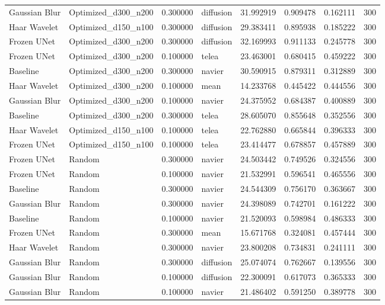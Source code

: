 \begin{table}[h]
\begin{tabular}{llrlrrrr}
Gaussian Blur & Optimized\_d300\_n200 & 0.300000 & diffusion & 31.992919 & 0.909478 & 0.162111 & 300 \\
Haar Wavelet & Optimized\_d150\_n100 & 0.300000 & diffusion & 29.383411 & 0.895938 & 0.185222 & 300 \\
Frozen UNet & Optimized\_d300\_n200 & 0.300000 & diffusion & 32.169993 & 0.911133 & 0.245778 & 300 \\
Frozen UNet & Optimized\_d300\_n200 & 0.100000 & telea & 23.463001 & 0.680415 & 0.459222 & 300 \\
Baseline & Optimized\_d300\_n200 & 0.300000 & navier & 30.590915 & 0.879311 & 0.312889 & 300 \\
Haar Wavelet & Optimized\_d300\_n200 & 0.100000 & mean & 14.233768 & 0.445422 & 0.444556 & 300 \\
Gaussian Blur & Optimized\_d300\_n200 & 0.100000 & navier & 24.375952 & 0.684387 & 0.400889 & 300 \\
Baseline & Optimized\_d300\_n200 & 0.300000 & telea & 28.605070 & 0.855648 & 0.352556 & 300 \\
Haar Wavelet & Optimized\_d150\_n100 & 0.100000 & telea & 22.762880 & 0.665844 & 0.396333 & 300 \\
Frozen UNet & Optimized\_d150\_n100 & 0.100000 & telea & 23.414477 & 0.678857 & 0.457889 & 300 \\
Frozen UNet & Random & 0.300000 & navier & 24.503442 & 0.749526 & 0.324556 & 300 \\
Frozen UNet & Random & 0.100000 & navier & 21.532991 & 0.596541 & 0.465556 & 300 \\
Baseline & Random & 0.300000 & navier & 24.544309 & 0.756170 & 0.363667 & 300 \\
Gaussian Blur & Random & 0.300000 & navier & 24.398089 & 0.742701 & 0.161222 & 300 \\
Baseline & Random & 0.100000 & navier & 21.520093 & 0.598984 & 0.486333 & 300 \\
Frozen UNet & Random & 0.300000 & mean & 15.671768 & 0.324081 & 0.457444 & 300 \\
Haar Wavelet & Random & 0.300000 & navier & 23.800208 & 0.734831 & 0.241111 & 300 \\
Gaussian Blur & Random & 0.300000 & diffusion & 25.074074 & 0.762667 & 0.139556 & 300 \\
Gaussian Blur & Random & 0.100000 & diffusion & 22.300091 & 0.617073 & 0.365333 & 300 \\
Gaussian Blur & Random & 0.100000 & navier & 21.486402 & 0.591250 & 0.389778 & 300 \\

\end{tabular}
\end{table}
